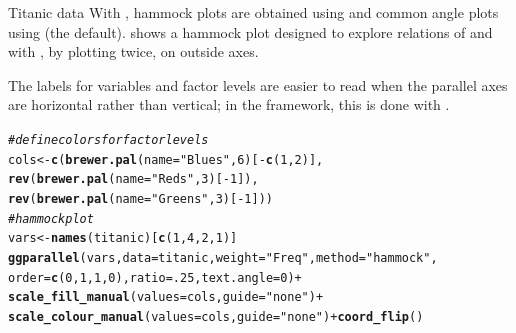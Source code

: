 \documentclass[11pt]{book}\usepackage[]{graphicx}\usepackage[]{color}
\makeatletter
\newcommand{\hlnum}[1]{\textcolor[rgb]{0.686,0.059,0.569}{#1}}%
\newcommand{\hlstr}[1]{\textcolor[rgb]{0.192,0.494,0.8}{#1}}%
\newcommand{\hlcom}[1]{\textcolor[rgb]{0.678,0.584,0.686}{\textit{#1}}}%
\newcommand{\hlopt}[1]{\textcolor[rgb]{0,0,0}{#1}}%
\newcommand{\hlstd}[1]{\textcolor[rgb]{0.345,0.345,0.345}{#1}}%
\newcommand{\hlkwb}[1]{\textcolor[rgb]{0.69,0.353,0.396}{#1}}%
\newcommand{\hlkwc}[1]{\textcolor[rgb]{0.333,0.667,0.333}{#1}}%
\newcommand{\hlkwd}[1]{\textcolor[rgb]{0.737,0.353,0.396}{\textbf{#1}}}%
\newenvironment{kframe}{%
 \def\at@end@of@kframe{}%
 \ifinner\ifhmode%
  \def\at@end@of@kframe{\end{minipage}}%
  \begin{minipage}{\columnwidth}%
 \fi\fi%
 \def\FrameCommand##1{\hskip\@totalleftmargin \hskip-\fboxsep
 \colorbox{shadecolor}{##1}\hskip-\fboxsep
     \hskip-\linewidth \hskip-\@totalleftmargin \hskip\columnwidth}%
 \MakeFramed {\advance\hsize-\width
   \@totalleftmargin\z@ \linewidth\hsize
   \@setminipage}}%
 {\par\unskip\endMakeFramed%
 \at@end@of@kframe}
\newenvironment{knitrout}{}{} %
\renewenvironment{knitrout}{\small\renewcommand{\baselinestretch}{.85}}{} %
\makeatother
\begin{document}
\begin{Example}{Titanic data}
With , hammock plots are obtained using 
and common angle plots using  (the default).
 shows a hammock plot designed to explore relations
of  and  with , by plotting 
twice, on outside axes.

The labels for variables and factor levels are easier to read when the 
parallel axes are horizontal rather than vertical;  in the 
framework, this is done with .

\begin{knitrout}
\color{fgcolor}\begin{kframe}
\begin{alltt}
\hlcom{# define colors for factor levels}
\hlstd{cols} \hlkwb{<-} \hlkwd{c}\hlstd{(}\hlkwd{brewer.pal}\hlstd{(}\hlkwc{name}\hlstd{=}\hlstr{"Blues"}\hlstd{,} \hlnum{6}\hlstd{)[}\hlopt{-}\hlkwd{c}\hlstd{(}\hlnum{1}\hlstd{,}\hlnum{2}\hlstd{)],}
          \hlkwd{rev}\hlstd{(}\hlkwd{brewer.pal}\hlstd{(}\hlkwc{name}\hlstd{=}\hlstr{"Reds"}\hlstd{,} \hlnum{3}\hlstd{)[}\hlopt{-}\hlnum{1}\hlstd{]),}
          \hlkwd{rev}\hlstd{(}\hlkwd{brewer.pal}\hlstd{(}\hlkwc{name}\hlstd{=}\hlstr{"Greens"}\hlstd{,}\hlnum{3}\hlstd{)[}\hlopt{-}\hlnum{1}\hlstd{]))}
\hlcom{# hammock plot }
\hlstd{vars} \hlkwb{<-} \hlkwd{names}\hlstd{(titanic)[}\hlkwd{c}\hlstd{(}\hlnum{1}\hlstd{,} \hlnum{4}\hlstd{,} \hlnum{2}\hlstd{,} \hlnum{1}\hlstd{)]}
\hlkwd{ggparallel}\hlstd{(vars,} \hlkwc{data}\hlstd{=titanic,} \hlkwc{weight}\hlstd{=}\hlstr{"Freq"}\hlstd{,} \hlkwc{method}\hlstd{=}\hlstr{"hammock"}\hlstd{,}
          \hlkwc{order}\hlstd{=}\hlkwd{c}\hlstd{(}\hlnum{0}\hlstd{,}\hlnum{1}\hlstd{,}\hlnum{1}\hlstd{,}\hlnum{0}\hlstd{),} \hlkwc{ratio}\hlstd{=}\hlnum{.25}\hlstd{,} \hlkwc{text.angle}\hlstd{=}\hlnum{0}\hlstd{)} \hlopt{+}
  \hlkwd{scale_fill_manual}\hlstd{(}\hlkwc{values}\hlstd{=cols,} \hlkwc{guide}\hlstd{=}\hlstr{"none"}\hlstd{)} \hlopt{+}
  \hlkwd{scale_colour_manual}\hlstd{(}\hlkwc{values}\hlstd{=cols,} \hlkwc{guide}\hlstd{=}\hlstr{"none"}\hlstd{)} \hlopt{+} \hlkwd{coord_flip}\hlstd{()}
\end{alltt}
\end{kframe}\begin{figure}[htbp]



\end{figure}
\end{knitrout}
\end{Example}
\end{document}
